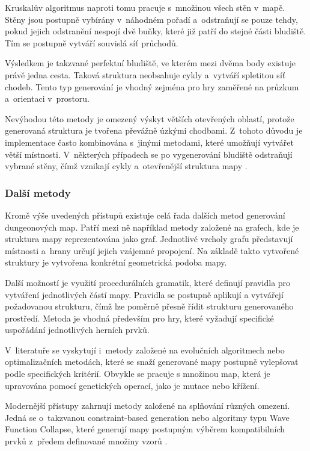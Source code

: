 \documentclass[
   program=itk,
   biblatex,
   figures=true,
   tables=true,
   glossaries,
   index
]{kidiplom}
\begin{document}
Kruskalův algoritmus naproti tomu pracuje s~množinou všech stěn v~mapě. Stěny jsou postupně vybírány v~náhodném pořadí a~odstraňují se pouze tehdy, pokud jejich odstranění nespojí dvě buňky, které již patří do stejné části bludiště. Tím se postupně vytváří souvislá síť průchodů.

Výsledkem je takzvané perfektní bludiště, ve kterém mezi dvěma body existuje právě jedna cesta. Taková struktura neobsahuje cykly a~vytváří spletitou síť chodeb. Tento typ generování je vhodný zejména pro hry zaměřené na průzkum a~orientaci v~prostoru.

Nevýhodou této metody je omezený výskyt větších otevřených oblastí, protože generovaná struktura je tvořena převážně úzkými chodbami. Z~tohoto důvodu je implementace často kombinována s~jinými metodami, které umožňují vytvářet větší místnosti. V~některých případech se po vygenerování bludiště odstraňují vybrané stěny, čímž vznikají cykly a~otevřenější struktura mapy \cite{Linden2014,Shaker2016,Kozlova2015}.

\subsubsection{Další metody}

Kromě výše uvedených přístupů existuje celá řada dalších metod generování dungeonových map. Patří mezi ně například metody založené na grafech, kde je struktura mapy reprezentována jako graf. Jednotlivé vrcholy grafu představují místnosti a~hrany určují jejich vzájemné propojení. Na základě takto vytvořené struktury je vytvořena konkrétní geometrická podoba mapy.

Další možností je využití procedurálních gramatik, které definují pravidla pro vytváření jednotlivých částí mapy. Pravidla se postupně aplikují a vytvářejí požadovanou strukturu, čímž lze poměrně přesně řídit strukturu generovaného prostředí. Metoda je vhodná především pro hry, které vyžadují specifické uspořádání jednotlivých herních prvků.

V~literatuře se vyskytují i~metody založené na evolučních algoritmech nebo optimalizačních metodách, které se snaží generované mapy postupně vylepšovat podle specifických kritérií. Obvykle se pracuje s množinou map, která je upravována pomocí genetických operací, jako je mutace nebo křížení.

Modernější přístupy zahrnují metody založené na splňování různých omezení. Jedná se o~takzvanou constraint-based generation nebo algoritmy typu Wave Function Collapse, které generují mapy postupným výběrem kompatibilních prvků z~předem definované množiny vzorů \cite{Gumin2016}.
\end{document}
